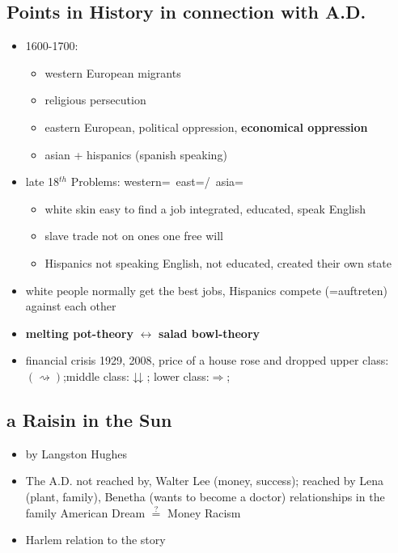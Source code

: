 \documentclass[a5paper,12pt,twoside,titlepage]{scrartcl}
\begin{document}
	\subsection{Points in History in connection with A.D.}
		\begin{itemize}
			\item 1600-1700: 
				\begin{itemize}
					\item western European migrants
					\item \textrightarrow religious persecution 
					\item eastern European, political oppression, \textbf{economical oppression}
					\item asian + hispanics (spanish speaking)
				\end{itemize}
			\item late 18$ ^{th} $ Problems: western=\frownie\ east=\smiley/\frownie\ asia=\smiley\ 
				\begin{itemize}
					\item white skin \textrightarrow easy to find a job \textrightarrow integrated, educated, speak English
					\item slave trade \glqq not on ones one free will\grqq
					\item Hispanics \textrightarrow not speaking English, not educated, \textrightarrow created their own \glqq state\grqq 
				\end{itemize}
			\item white people normally get the best jobs, Hispanics compete (=auftreten) against each other
			\item \textbf{melting pot-theory} $\leftrightarrow$ \textbf{salad bowl-theory} 
			\item financial crisis 1929, 2008, price of a house rose and dropped
			\subitem  upper class:$ (\rightsquigarrow) $;middle class:$ \downdownarrows $; lower class:$ \Longrightarrow $;
		\end{itemize}
	\subsection{a Raisin in the Sun}
		\begin{itemize}
			\item by Langston Hughes
			\subitem 
			\item The A.D.
			\subitem  not reached by, Walter Lee (money, success); reached by Lena (plant, family), Benetha (wants to become a doctor)
			\subitem relationships in the family
			\subitem American Dream $ \stackrel{?}{=} $ Money
			\subitem Racism
			\item Harlem
			\subitem \textrightarrow relation to the story
		\end{itemize}
\end{document}
